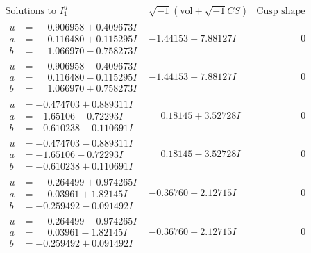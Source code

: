 \documentclass[1p]{elsarticle_modified}
\theoremstyle{definition}
\newcommand{\I}{\sqrt{-1}}
\begin{document}
$$\begin{array}{c|c|c}  
\text{Solutions to }I^u_{1}& \I (\text{vol} + \sqrt{-1}CS) & \text{Cusp shape}\\
 \hline 
\begin{aligned}
u &= \phantom{-}0.906958 + 0.409673 I \\
a &= \phantom{-}0.116480 + 0.115295 I \\
b &= \phantom{-}1.066970 - 0.758273 I\end{aligned}
 & -1.44153 + 7.88127 I & \phantom{-0.000000 } 0 \\ \hline\begin{aligned}
u &= \phantom{-}0.906958 - 0.409673 I \\
a &= \phantom{-}0.116480 - 0.115295 I \\
b &= \phantom{-}1.066970 + 0.758273 I\end{aligned}
 & -1.44153 - 7.88127 I & \phantom{-0.000000 } 0 \\ \hline\begin{aligned}
u &= -0.474703 + 0.889311 I \\
a &= -1.65106 + 0.72293 I \\
b &= -0.610238 - 0.110691 I\end{aligned}
 & \phantom{-}0.18145 + 3.52728 I & \phantom{-0.000000 } 0 \\ \hline\begin{aligned}
u &= -0.474703 - 0.889311 I \\
a &= -1.65106 - 0.72293 I \\
b &= -0.610238 + 0.110691 I\end{aligned}
 & \phantom{-}0.18145 - 3.52728 I & \phantom{-0.000000 } 0 \\ \hline\begin{aligned}
u &= \phantom{-}0.264499 + 0.974265 I \\
a &= \phantom{-}0.03961 + 1.82145 I \\
b &= -0.259492 - 0.091492 I\end{aligned}
 & -0.36760 + 2.12715 I & \phantom{-0.000000 } 0 \\ \hline\begin{aligned}
u &= \phantom{-}0.264499 - 0.974265 I \\
a &= \phantom{-}0.03961 - 1.82145 I \\
b &= -0.259492 + 0.091492 I\end{aligned}
 & -0.36760 - 2.12715 I & \phantom{-0.000000 } 0 \\ \hline\begin{aligned}

\end{aligned}
\end{array}$$
\end{document}
